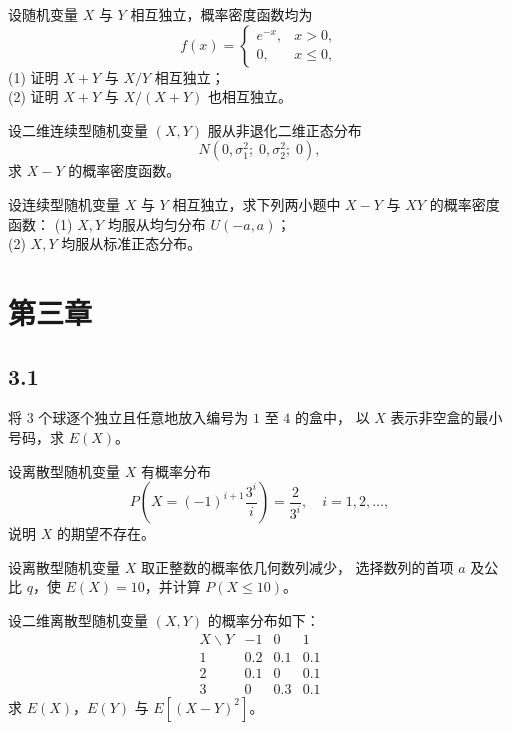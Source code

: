 \begin{homework}[2.61]
设随机变量 $X$ 与 $Y$ 相互独立，概率密度函数均为
\[
f(x)=
\begin{cases}
e^{-x}, & x>0,\\[4pt]
0, & x\le0,
\end{cases}
\]
(1) 证明 $X+Y$ 与 $X/Y$ 相互独立；\\
(2) 证明 $X+Y$ 与 $X/(X+Y)$ 也相互独立。
\end{homework}

\begin{homework}[2.62]
设二维连续型随机变量 $(X,Y)$ 服从非退化二维正态分布
\[
N(0,\sigma_1^2;\;0,\sigma_2^2;\;0),
\]
求 $X-Y$ 的概率密度函数。
\end{homework}

\begin{homework}[2.63]
设连续型随机变量 $X$ 与 $Y$ 相互独立，求下列两小题中 $X-Y$ 与 $XY$ 的概率密度函数：  
(1) $X,Y$ 均服从均匀分布 $U(-a,a)$；\\
(2) $X,Y$ 均服从标准正态分布。
\end{homework}
\section{第三章}
\subsection*{3.1}
\begin{homework}[3.3]
将 $3$ 个球逐个独立且任意地放入编号为 $1$ 至 $4$ 的盒中，
以 $X$ 表示非空盒的最小号码，求 $E(X)$。
\end{homework}

\begin{homework}[3.4]
设离散型随机变量 $X$ 有概率分布
\[
P\!\left(X=(-1)^{i+1}\frac{3^i}{i}\right)=\frac{2}{3^i},\quad i=1,2,\ldots,
\]
说明 $X$ 的期望不存在。
\end{homework}

\begin{homework}[3.7]
设离散型随机变量 $X$ 取正整数的概率依几何数列减少，
选择数列的首项 $a$ 及公比 $q$，使 $E(X)=10$，并计算 $P(X\le 10)$。
\end{homework}

\begin{homework}[3.19]
设二维离散型随机变量 $(X,Y)$ 的概率分布如下：
\[
\begin{array}{c|ccc}
  X\backslash Y & -1 & 0 & 1\\ \hline
  1 & 0.2 & 0.1 & 0.1\\
  2 & 0.1 & 0 & 0.1\\
  3 & 0 & 0.3 & 0.1
\end{array}
\]
求 $E(X)$，$E(Y)$ 与 $E[(X-Y)^2]$。
\end{homework}

